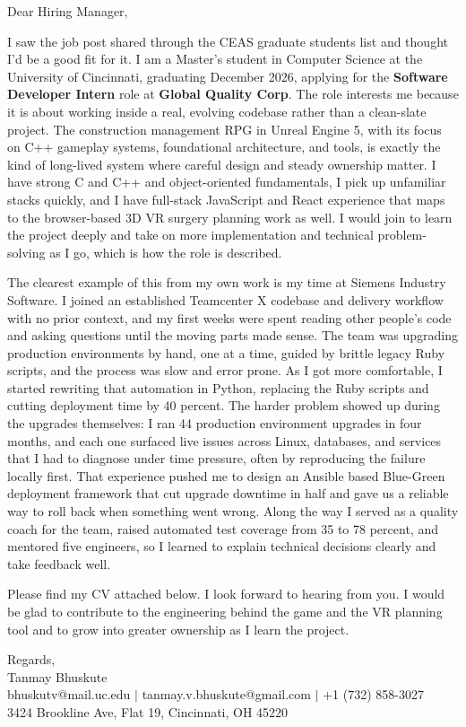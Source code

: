 \documentclass[11pt]{letter}
\date{}
\begin{document}
\begin{letter}{}

\opening{Dear Hiring Manager,}

I saw the job post shared through the CEAS graduate students list and thought I'd be a good fit for it. I am a Master's student in Computer Science at the University of Cincinnati, graduating December 2026, applying for the \textbf{Software Developer Intern} role at \textbf{Global Quality Corp}. The role interests me because it is about working inside a real, evolving codebase rather than a clean-slate project. The construction management RPG in Unreal Engine 5, with its focus on C++ gameplay systems, foundational architecture, and tools, is exactly the kind of long-lived system where careful design and steady ownership matter. I have strong C and C++ and object-oriented fundamentals, I pick up unfamiliar stacks quickly, and I have full-stack JavaScript and React experience that maps to the browser-based 3D VR surgery planning work as well. I would join to learn the project deeply and take on more implementation and technical problem-solving as I go, which is how the role is described.

The clearest example of this from my own work is my time at Siemens Industry Software. I joined an established Teamcenter X codebase and delivery workflow with no prior context, and my first weeks were spent reading other people's code and asking questions until the moving parts made sense. The team was upgrading production environments by hand, one at a time, guided by brittle legacy Ruby scripts, and the process was slow and error prone. As I got more comfortable, I started rewriting that automation in Python, replacing the Ruby scripts and cutting deployment time by 40 percent. The harder problem showed up during the upgrades themselves: I ran 44 production environment upgrades in four months, and each one surfaced live issues across Linux, databases, and services that I had to diagnose under time pressure, often by reproducing the failure locally first. That experience pushed me to design an Ansible based Blue-Green deployment framework that cut upgrade downtime in half and gave us a reliable way to roll back when something went wrong. Along the way I served as a quality coach for the team, raised automated test coverage from 35 to 78 percent, and mentored five engineers, so I learned to explain technical decisions clearly and take feedback well.

Please find my CV attached below. I look forward to hearing from you. I would be glad to contribute to the engineering behind the game and the VR planning tool and to grow into greater ownership as I learn the project.

{\setlength{\parskip}{0pt}
Regards,\\
Tanmay Bhuskute\\
bhuskutv@mail.uc.edu $\mid$ tanmay.v.bhuskute@gmail.com $\mid$ +1 (732) 858-3027\\
3424 Brookline Ave, Flat 19, Cincinnati, OH 45220
}

\end{letter}
\end{document}

